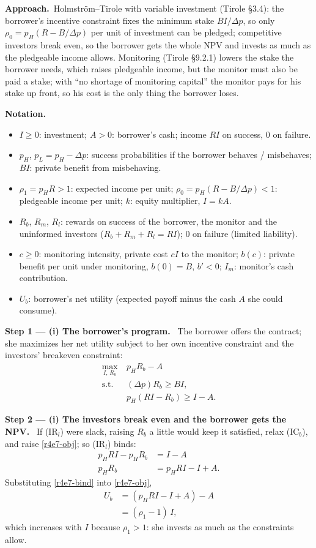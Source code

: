 \documentclass[11pt,a4paper]{article}
\newcommand{\notation}{\par\noindent\textbf{Notation.}}
\newcommand{\step}[2]{\par\medskip\noindent\textbf{Step #1 --- #2.}~}
\newcommand{\approach}{\par\smallskip\noindent\textbf{Approach.}~}
\begin{document}
\approach Holmstr\"om--Tirole with variable investment (Tirole \S3.4): the borrower's
incentive constraint fixes the minimum stake $BI/\Delta p$, so only $\rho_0=p_H(R-B/\Delta p)$
per unit of investment can be pledged; competitive investors break even, so the borrower gets
the whole NPV and invests as much as the pledgeable income allows. Monitoring (Tirole \S9.2.1)
lowers the stake the borrower needs, which raises pledgeable income, but the monitor must also be
paid a stake; with ``no shortage of monitoring capital'' the monitor pays for his stake up front,
so his cost is the only thing the borrower loses.

\notation
\begin{itemize}
  \item $I\ge 0$: investment; $A>0$: borrower's cash; income $RI$ on success, $0$ on failure.
  \item $p_H$, $p_L=p_H-\Delta p$: success probabilities if the borrower behaves / misbehaves; $BI$: private benefit from misbehaving.
  \item $\rho_1=p_HR>1$: expected income per unit; $\rho_0=p_H(R-B/\Delta p)<1$: pledgeable income per unit; $k$: equity multiplier, $I=kA$.
  \item $R_b$, $R_m$, $R_l$: rewards on success of the borrower, the monitor and the uninformed investors ($R_b+R_m+R_l=RI$); $0$ on failure (limited liability).
  \item $c\ge 0$: monitoring intensity, private cost $cI$ to the monitor; $b(c)$: private benefit per unit under monitoring, $b(0)=B$, $b'<0$; $I_m$: monitor's cash contribution.
  \item $U_b$: borrower's net utility (expected payoff minus the cash $A$ she could consume).
\end{itemize}

\step{1}{(i) The borrower's program} The borrower offers the contract; she maximizes her net
utility subject to her own incentive constraint and the investors' breakeven constraint:
\begin{align}
  \max_{I,\,R_b}\ & p_HR_b-A \label{r4e7-obj}\\
  \text{s.t. }\ & (\Delta p)R_b\ge BI, \tag{IC$_b$}\\
                & p_H(RI-R_b)\ge I-A. \tag{IR$_l$}
\end{align}

\step{2}{(i) The investors break even and the borrower gets the NPV} If (IR$_l$) were slack,
raising $R_b$ a little would keep it satisfied, relax (IC$_b$), and raise \eqref{r4e7-obj}; so
(IR$_l$) binds:
\begin{align}
  p_HRI-p_HR_b &= I-A \nonumber\\
  p_HR_b &= p_HRI-I+A. \label{r4e7-bind}
\end{align}
Substituting \eqref{r4e7-bind} into \eqref{r4e7-obj},
\begin{align}
  U_b &= (p_HRI-I+A)-A \nonumber\\
      &= (\rho_1-1)\,I, \label{r4e7-Ub}
\end{align}
which increases with $I$ because $\rho_1>1$: she invests as much as the constraints allow.
\end{document}
